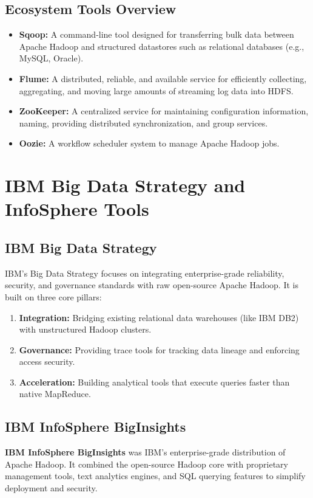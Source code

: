 \documentclass[12pt,a4paper]{article}
\begin{document}
\subsection{Ecosystem Tools Overview}
\begin{itemize}[leftmargin=*, itemsep=3pt]
  \item \textbf{Sqoop:} A command-line tool designed for transferring bulk data between Apache Hadoop and structured datastores such as relational databases (e.g., MySQL, Oracle).
  \item \textbf{Flume:} A distributed, reliable, and available service for efficiently collecting, aggregating, and moving large amounts of streaming log data into HDFS.
  \item \textbf{ZooKeeper:} A centralized service for maintaining configuration information, naming, providing distributed synchronization, and group services.
  \item \textbf{Oozie:} A workflow scheduler system to manage Apache Hadoop jobs.
\end{itemize}

\section{IBM Big Data Strategy and InfoSphere Tools}

\subsection{IBM Big Data Strategy}
IBM's Big Data Strategy focuses on integrating enterprise-grade reliability, security, and governance standards with raw open-source Apache Hadoop. It is built on three core pillars:
\begin{enumerate}[leftmargin=*, itemsep=2pt]
  \item \textbf{Integration:} Bridging existing relational data warehouses (like IBM DB2) with unstructured Hadoop clusters.
  \item \textbf{Governance:} Providing trace tools for tracking data lineage and enforcing access security.
  \item \textbf{Acceleration:} Building analytical tools that execute queries faster than native MapReduce.
\end{enumerate}

\subsection{IBM InfoSphere BigInsights}
\begin{tcolorbox}[defbox, title={InfoSphere BigInsights}]
  \textbf{IBM InfoSphere BigInsights} was IBM's enterprise-grade distribution of Apache Hadoop. It combined the open-source Hadoop core with proprietary management tools, text analytics engines, and SQL querying features to simplify deployment and security.
\end{tcolorbox}
\end{document}
